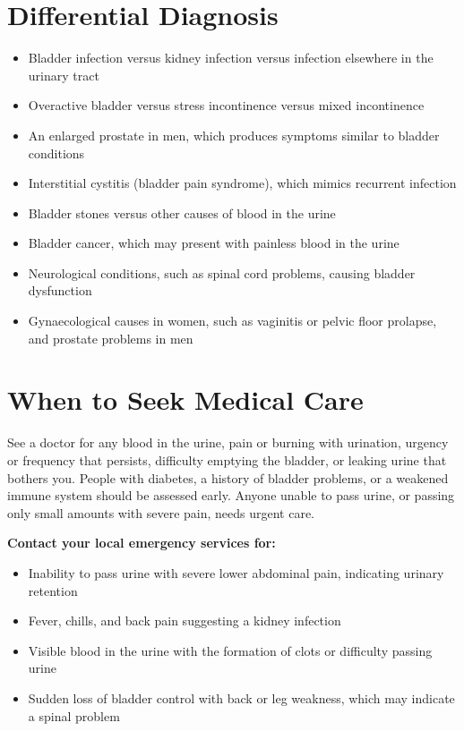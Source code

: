 \section*{Differential Diagnosis}
\begin{itemize}
    \item Bladder infection versus kidney infection versus infection elsewhere in the urinary tract
    \item Overactive bladder versus stress incontinence versus mixed incontinence
    \item An enlarged prostate in men, which produces symptoms similar to bladder conditions
    \item Interstitial cystitis (bladder pain syndrome), which mimics recurrent infection
    \item Bladder stones versus other causes of blood in the urine
    \item Bladder cancer, which may present with painless blood in the urine
    \item Neurological conditions, such as spinal cord problems, causing bladder dysfunction
    \item Gynaecological causes in women, such as vaginitis or pelvic floor prolapse, and prostate problems in men
\end{itemize}

\section*{When to Seek Medical Care}
See a doctor for any blood in the urine, pain or burning with urination, urgency or frequency that persists, difficulty emptying the bladder, or leaking urine that bothers you. People with diabetes, a history of bladder problems, or a weakened immune system should be assessed early. Anyone unable to pass urine, or passing only small amounts with severe pain, needs urgent care.

\textbf{Contact your local emergency services for:}
\begin{itemize}
    \item Inability to pass urine with severe lower abdominal pain, indicating urinary retention
    \item Fever, chills, and back pain suggesting a kidney infection
    \item Visible blood in the urine with the formation of clots or difficulty passing urine
    \item Sudden loss of bladder control with back or leg weakness, which may indicate a spinal problem
\end{itemize}

